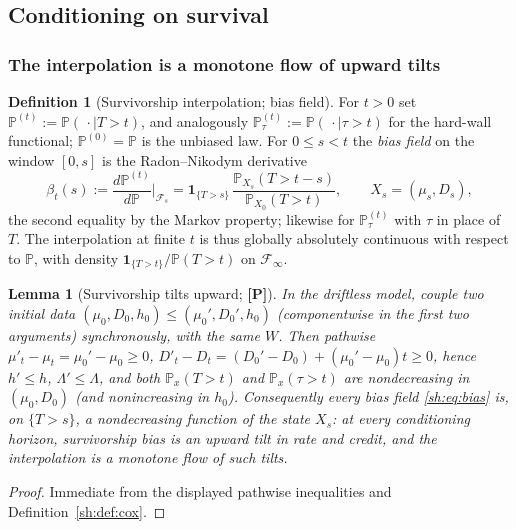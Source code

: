 \documentclass[11pt]{article}
\numberwithin{equation}{section}
\theoremstyle{plain}
\newtheorem{lemma}[theorem]{Lemma}
\theoremstyle{definition}
\newtheorem{definition}[theorem]{Definition}
\theoremstyle{remark}
\newcommand{\PP}{\mathbb{P}}
\newcommand{\one}{\mathbf{1}}
\newcommand{\Fc}{\mathcal{F}}
\begin{document}
\subsection{Conditioning on survival}\label{gr1:sub:cond}\label{sh:sub:interp}

\subsubsection{The interpolation is a monotone flow of upward tilts}
\label{sh:subsub:flow}

\begin{definition}[Survivorship interpolation; bias field]
\label{sh:def:interp}
For $t>0$ set $\PP^{(t)}:=\PP(\,\cdot\mid T>t)$, and analogously
$\PP^{(t)}_\tau:=\PP(\,\cdot\mid\tau>t)$ for the hard-wall functional;
$\PP^{(0)}=\PP$ is the unbiased law. For $0\le s<t$ the \emph{bias field}
on the window $[0,s]$ is the Radon--Nikodym derivative
\begin{equation}\label{sh:eq:bias}
\beta_t(s):=\frac{d\PP^{(t)}}{d\PP}\Big|_{\Fc_s}
=\one_{\{T>s\}}\,
\frac{\PP_{X_s}(T>t-s)}{\PP_{X_0}(T>t)},
\qquad X_s=(\mu_s,D_s),
\end{equation}
the second equality by the Markov property; likewise for
$\PP^{(t)}_\tau$ with $\tau$ in place of $T$. The interpolation at finite
$t$ is thus globally absolutely continuous with respect to $\PP$, with
density $\one_{\{T>t\}}/\PP(T>t)$ on $\Fc_\infty$.
\end{definition}

\begin{lemma}[Survivorship tilts upward; \textbf{[P]}]\label{sh:lem:monotone}
In the driftless model, couple two initial data
$(\mu_0,D_0,h_0)\le(\mu_0',D_0',h_0)$ (componentwise in the first two
arguments) synchronously, with the same $W$. Then pathwise
$\mu'_t-\mu_t=\mu_0'-\mu_0\ge0$,
$D'_t-D_t=(D_0'-D_0)+(\mu_0'-\mu_0)t\ge0$, hence $h'\le h$,
$\Lambda'\le\Lambda$, and both $\PP_x(T>t)$ and $\PP_x(\tau>t)$ are
nondecreasing in $(\mu_0,D_0)$ (and nonincreasing in $h_0$). Consequently
every bias field \eqref{sh:eq:bias} is, on $\{T>s\}$, a nondecreasing
function of the state $X_s$: at every conditioning horizon, survivorship
bias is an upward tilt in rate and credit, and the interpolation is a
monotone flow of such tilts.
\end{lemma}

\begin{proof}
Immediate from the displayed pathwise inequalities and
Definition~\ref{sh:def:cox}.
\end{proof}
\end{document}
